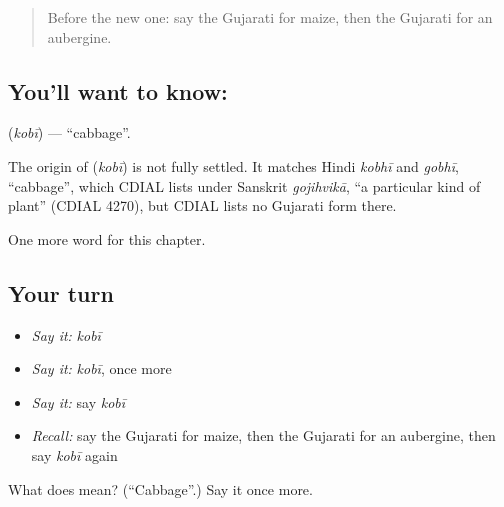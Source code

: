 \begin{quote}
Before the new one: say the Gujarati for maize, then the Gujarati for an aubergine.
\end{quote}

\subsection*{You'll want to know: }
\textbf{} (\emph{kobī}) — \textquotedblleft{}cabbage\textquotedblright{}.

\begin{cousinweb}
The origin of \textbf{} (\emph{kobī}) is not fully settled. It matches Hindi \emph{kobhī} and \emph{gobhī}, \textquotedblleft{}cabbage\textquotedblright{}, which CDIAL lists under Sanskrit \emph{gojihvikā}, \textquotedblleft{}a particular kind of plant\textquotedblright{} (CDIAL 4270), but CDIAL lists no Gujarati form there.
\end{cousinweb}

\begin{grammarlens}[title={What you've built}]
One more word for this chapter.
\end{grammarlens}

\subsection*{Your turn}
\begin{itemize}
\raggedright
  \item \emph{Say it:} \emph{kobī}
  \item \emph{Say it:} \emph{kobī}, once more
  \item \emph{Say it:} say \emph{kobī}
  \item \emph{Recall:} say the Gujarati for maize, then the Gujarati for an aubergine, then say \emph{kobī} again
\end{itemize}

\begin{tcolorbox}[breakable,colback=teal!4,colframe=teal!35!black,title={Before you move on}]
What does  mean? (\textquotedblleft{}Cabbage\textquotedblright{}.) Say it once more.
\end{tcolorbox}
